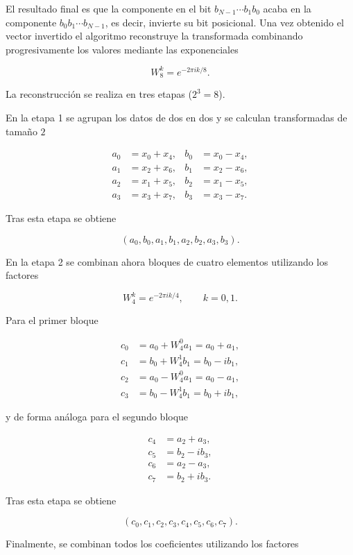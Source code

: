 \documentclass[11pt,a4paper,twoside,pdf]{article}
\numberwithin{equation}{section}
\begin{document}
El resultado final es que la componente en el bit $b_{N-1}\cdots b_{1}b_{0}$ acaba en la componente $b_0b_{1}\cdots b_{N-1}$, es decir, invierte su bit posicional. Una vez obtenido el vector invertido el algoritmo reconstruye la transformada combinando progresivamente los valores mediante las exponenciales

\[
W_8^k = e^{-2\pi i k/8}.
\]


La reconstrucción se realiza en tres etapas ($2^3=8$).

En la etapa 1 se agrupan los datos de dos en dos y se calculan transformadas de tamaño $2$

\[
\begin{aligned}
a_0 &= x_0 + x_4, & b_0 &= x_0 - x_4,\\
a_1 &= x_2 + x_6, & b_1 &= x_2 - x_6,\\
a_2 &= x_1 + x_5, & b_2 &= x_1 - x_5,\\
a_3 &= x_3 + x_7, & b_3 &= x_3 - x_7.
\end{aligned}
\]

Tras esta etapa se obtiene

\[
(a_0,b_0,a_1,b_1,a_2,b_2,a_3,b_3).
\]

En la etapa 2 se combinan ahora bloques de cuatro elementos utilizando los factores

\[
W_4^k = e^{-2\pi i k/4}, \qquad k=0,1.
\]

Para el primer bloque

\[
\begin{aligned}
c_0 &= a_0 + W_4^0 a_1 = a_0 + a_1,\\
c_1 &= b_0 + W_4^1 b_1 = b_0 - i b_1,\\
c_2 &= a_0 - W_4^0 a_1 = a_0 - a_1,\\
c_3 &= b_0 - W_4^1 b_1 = b_0 + i b_1,
\end{aligned}
\]

y de forma análoga para el segundo bloque

\[
\begin{aligned}
c_4 &= a_2 + a_3,\\
c_5 &= b_2 - i b_3,\\
c_6 &= a_2 - a_3,\\
c_7 &= b_2 + i b_3.
\end{aligned}
\]

Tras esta etapa se obtiene

\[
(c_0,c_1,c_2,c_3,c_4,c_5,c_6,c_7).
\]


Finalmente, se combinan todos los coeficientes utilizando los factores
\end{document}
